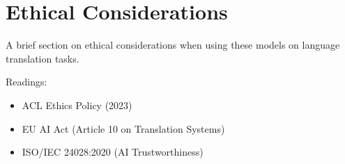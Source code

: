 \section{Ethical Considerations}
\label{sec:ethics}

A brief section on ethical considerations when using these models on language translation tasks. %

\noindent Readings: %

\begin{itemize}
    \item ACL Ethics Policy (2023)
    \item EU AI Act (Article 10 on Translation Systems)
    \item ISO/IEC 24028:2020 (AI Trustworthiness)
\end{itemize}
